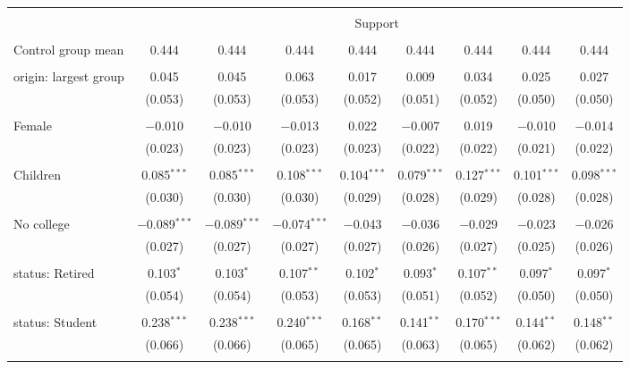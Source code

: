 
\begin{tabular}{@{\extracolsep{5pt}}lcccccccc} 
\\[-1.8ex]\hline 
\hline \\[-1.8ex] 
 & \multicolumn{8}{c}{Support} \\ 
\cline{2-9} 
\hline \\[-1.8ex] 
 Control group mean & 0.444 & 0.444 & 0.444 & 0.444 & 0.444 & 0.444 & 0.444 & 0.444  \\ \hline \\[-1.8ex] origin: largest group & 0.045 & 0.045 & 0.063 & 0.017 & 0.009 & 0.034 & 0.025 & 0.027 \\ 
  & (0.053) & (0.053) & (0.053) & (0.052) & (0.051) & (0.052) & (0.050) & (0.050) \\ 
  & & & & & & & & \\ 
 Female & $-$0.010 & $-$0.010 & $-$0.013 & 0.022 & $-$0.007 & 0.019 & $-$0.010 & $-$0.014 \\ 
  & (0.023) & (0.023) & (0.023) & (0.023) & (0.022) & (0.022) & (0.021) & (0.022) \\ 
  & & & & & & & & \\ 
 Children & 0.085$^{***}$ & 0.085$^{***}$ & 0.108$^{***}$ & 0.104$^{***}$ & 0.079$^{***}$ & 0.127$^{***}$ & 0.101$^{***}$ & 0.098$^{***}$ \\ 
  & (0.030) & (0.030) & (0.030) & (0.029) & (0.028) & (0.029) & (0.028) & (0.028) \\ 
  & & & & & & & & \\ 
 No college & $-$0.089$^{***}$ & $-$0.089$^{***}$ & $-$0.074$^{***}$ & $-$0.043 & $-$0.036 & $-$0.029 & $-$0.023 & $-$0.026 \\ 
  & (0.027) & (0.027) & (0.027) & (0.027) & (0.026) & (0.027) & (0.025) & (0.026) \\ 
  & & & & & & & & \\ 
 status: Retired & 0.103$^{*}$ & 0.103$^{*}$ & 0.107$^{**}$ & 0.102$^{*}$ & 0.093$^{*}$ & 0.107$^{**}$ & 0.097$^{*}$ & 0.097$^{*}$ \\ 
  & (0.054) & (0.054) & (0.053) & (0.053) & (0.051) & (0.052) & (0.050) & (0.050) \\ 
  & & & & & & & & \\ 
 status: Student & 0.238$^{***}$ & 0.238$^{***}$ & 0.240$^{***}$ & 0.168$^{**}$ & 0.141$^{**}$ & 0.170$^{***}$ & 0.144$^{**}$ & 0.148$^{**}$ \\ 
  & (0.066) & (0.066) & (0.065) & (0.065) & (0.063) & (0.065) & (0.062) & (0.062) \\ 
  & & & & & & & & \\ 

\end{tabular}
